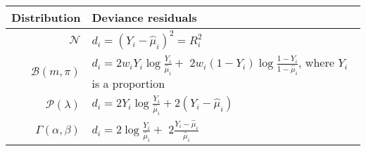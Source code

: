 \begin{tabular}{r l}
\hline
Distribution           & Deviance residuals
\\\hline
$\mathcal{N}$          & $d_i = (Y_i - \widehat\mu_i)^2 = R_i^2$
\\
$\mathcal{B}(m, \pi)$  &
$d_i = 2 w_i Y_i \log\frac{Y_i}{\widehat\mu_i} + $
$2 w_i(1-Y_i)\log\frac{1-Y_i}{1-\widehat\mu_i}$,
where $Y_i$ is a proportion
\\
$\mathcal{P}(\lambda)$ &
$d_i = 2 Y_i \log\frac{Y_i}{\widehat\mu_i} + 2(Y_i - \widehat\mu_i)$
\\
$\Gamma(\alpha,\beta)$ & $d_i = 2\log\frac{Y_i}{\widehat\mu_i} +$
$2 \frac{Y_i - \widehat\mu_i}{\widehat\mu_i}$
\\\hline
\end{tabular}